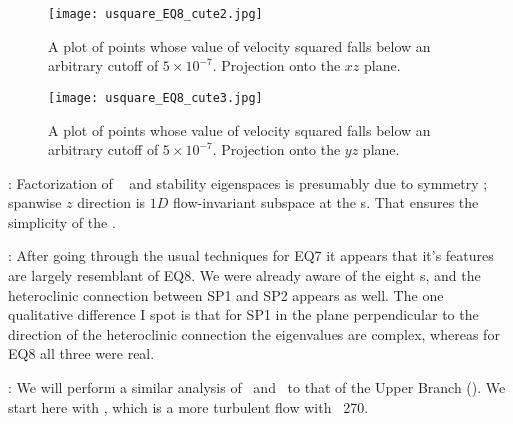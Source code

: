  \begin{figure}[!h]
\texttt{[image: usquare\_EQ8\_cute2.jpg]}
  \caption{
   A plot of points whose value of velocity squared falls below an
   arbitrary cutoff of $5\times 10^{-7}$. Projection onto the $xz$
   plane.
   }
  \label{eltonFig:usquare_EQ8_2}
 \end{figure}

 \begin{figure}[!h]
\texttt{[image: usquare\_EQ8\_cute3.jpg]}
  \caption{
   A plot of points whose value of velocity squared falls below an
   arbitrary cutoff of $5\times 10^{-7}$. Projection onto the $yz$
   plane.
   }
  \label{eltonFig:usquare_EQ8_3}
 \end{figure}


   : Factorization of \tEQeight\
 and  stability eigenspaces is presumably due to symmetry
\refeq{S3project}; spanwise $z$ direction is $1D$ flow-invariant subspace at
the \stagp s. That ensures the simplicity of the \hec.

  : After going through the
  usual techniques for EQ7 it appears that it's features are
  largely resemblant of EQ8. We were already aware of the
  eight \stagp s, and the heteroclinic connection between SP1 and
  SP2 appears as well. The one qualitative difference I spot is
  that for SP1 in the plane perpendicular to the direction of the
  heteroclinic connection the eigenvalues are complex, whereas for
  EQ8 all three were real.

   :
 We will perform a similar analysis of \tEQeight\ and \tLB\ to that of the Upper
 Branch (\tUB). We start here with \tEQeight, which is a more turbulent
 flow with \Reynolds\ 270.

